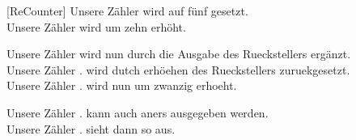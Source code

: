 \documentclass{scrartcl}
\begin{document}
[ReCounter]
Unsere Zähler  wird auf fünf gesetzt. \\
\setcounter{Counter}{5}
Unsere Zähler  wird um zehn erhöht.\\
\addtocounter{Counter}{10}
Unsere Zähler  wird  nun durch die Ausgabe des Rueckstellers ergänzt.\\
Unsere Zähler . wird dutch  erhöehen des Rueckstellers zuruekgesetzt.\\
Unsere Zähler . wird nun um zwanzig erhoeht.\\
\addtocounter{Counter}{20}
Unsere Zähler . kann auch aners ausgegeben werden.\\
Unsere Zähler . sieht dann so aus.\\ 

 
\end{document}
